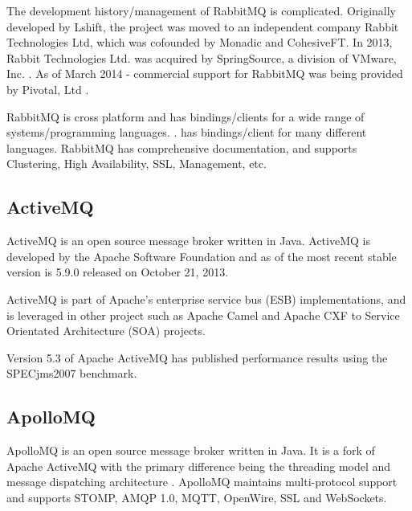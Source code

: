 \documentclass{thesis}
\begin{document}
The development history/management of RabbitMQ is complicated.  Originally developed by Lshift, the project was moved to an independent company Rabbit Technologies Ltd, which was cofounded by Monadic and CohesiveFT.  In 2013, Rabbit Technologies Ltd. was acquired by SpringSource, a division of VMware, Inc. .  As of March 2014 - commercial support for RabbitMQ was being provided by Pivotal, Ltd  .

RabbitMQ is cross platform and has bindings/clients for a wide range of systems/programming languages.  .  has bindings/client for many different languages.  RabbitMQ has comprehensive documentation, and supports Clustering, High Availability, SSL, Management, etc. 

\subsection{ActiveMQ}
ActiveMQ is an open source message broker written in Java.  ActiveMQ is developed by the Apache Software Foundation and as of  the most recent stable version is 5.9.0 released on October 21, 2013.

ActiveMQ is part of Apache's enterprise service bus (ESB) implementations, and is leveraged in other project such as Apache Camel and Apache CXF to Service Orientated Architecture (SOA) projects.

Version 5.3 of Apache ActiveMQ has published performance results using the SPECjms2007 benchmark.  


\subsection{ApolloMQ}
ApolloMQ is an open source message broker written in Java.  It is a fork of Apache ActiveMQ with the primary difference being the threading model and message dispatching architecture .  ApolloMQ maintains multi-protocol support and supports STOMP, AMQP 1.0, MQTT, OpenWire, SSL and WebSockets.
\end{document}
